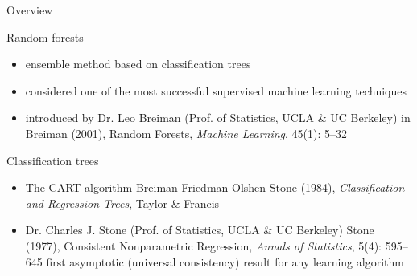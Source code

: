 

\begin{frame}{\LARGE Overview}

\vskip 0.3cm

\scriptsize
{\large Random forests}
\vskip 0.05cm
\begin{itemize}
\item
	ensemble method based on classification trees

\vskip 0.25cm
\item
	considered one of the most successful supervised machine learning techniques

\vskip 0.25cm
\item
	introduced by Dr. Leo Breiman (Prof. of Statistics, UCLA \& UC Berkeley) in
	\vskip 0.05cm
	Breiman (2001), Random Forests, \textit{Machine Learning}, 45(1): 5--32

\end{itemize}

\vskip 0.3cm
{\large Classification trees}
\vskip 0.05cm
\begin{itemize}
\item
	The CART algorithm
	\vskip 0.05cm
	Breiman-Friedman-Olshen-Stone (1984),
	\textit{{\color{red}C}lassification {\color{red}a}nd {\color{red}R}egression {\color{red}T}rees},
	Taylor \& Francis

\vskip 0.25cm
\item
	Dr. Charles J. Stone (Prof. of Statistics, UCLA \& UC Berkeley)
	\vskip 0.05cm
	Stone (1977), Consistent Nonparametric Regression, \textit{Annals of Statistics}, 5(4): 595--645
	\vskip 0.02cm
	{\tiny first asymptotic (universal consistency) result for any learning algorithm} %

\end{itemize}

\end{frame}
\normalsize

